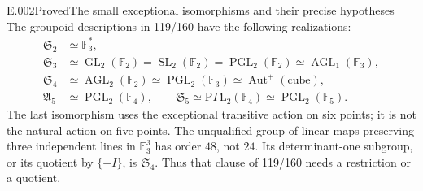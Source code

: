 \begin{saresult}{E.002}{Proved}{The small exceptional isomorphisms and their precise hypotheses}
The groupoid descriptions in 119/160 have the following realizations:
\[
\begin{aligned}
\mathfrak S_2&\simeq\mathbb F_3^*,\\
\mathfrak S_3&\simeq\operatorname{GL}_2(\mathbb F_2)
 =\operatorname{SL}_2(\mathbb F_2)
 =\operatorname{PGL}_2(\mathbb F_2)
 \simeq\operatorname{AGL}_1(\mathbb F_3),\\
\mathfrak S_4&\simeq\operatorname{AGL}_2(\mathbb F_2)
 \simeq\operatorname{PGL}_2(\mathbb F_3)
 \simeq\operatorname{Aut}^+(\text{cube}),\\
\mathfrak A_5&\simeq\operatorname{PGL}_2(\mathbb F_4),\qquad
\mathfrak S_5\simeq\mathrm{P}\Gamma\mathrm{L}_2(\mathbb F_4)
 \simeq\operatorname{PGL}_2(\mathbb F_5).
\end{aligned}
\]
The last isomorphism uses the exceptional transitive action on six points;
it is not the natural action on five points. The unqualified group of
linear maps preserving three independent lines in $\mathbb F_3^3$ has
order $48$, not $24$. Its determinant-one subgroup, or its quotient by
$\{\pm I\}$, is $\mathfrak S_4$. Thus that clause of 119/160 needs a
restriction or a quotient.
\end{saresult}
